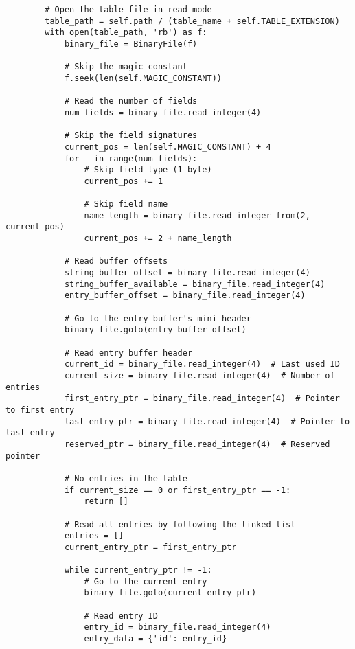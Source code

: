 \documentclass[utf8]{article}
\begin{document}
\begin{verbatim}
        # Open the table file in read mode
        table_path = self.path / (table_name + self.TABLE_EXTENSION)
        with open(table_path, 'rb') as f:
            binary_file = BinaryFile(f)
            
            # Skip the magic constant
            f.seek(len(self.MAGIC_CONSTANT))
            
            # Read the number of fields
            num_fields = binary_file.read_integer(4)
            
            # Skip the field signatures
            current_pos = len(self.MAGIC_CONSTANT) + 4
            for _ in range(num_fields):
                # Skip field type (1 byte)
                current_pos += 1
                
                # Skip field name
                name_length = binary_file.read_integer_from(2, current_pos)
                current_pos += 2 + name_length
            
            # Read buffer offsets
            string_buffer_offset = binary_file.read_integer(4)
            string_buffer_available = binary_file.read_integer(4)
            entry_buffer_offset = binary_file.read_integer(4)
            
            # Go to the entry buffer's mini-header
            binary_file.goto(entry_buffer_offset)
            
            # Read entry buffer header
            current_id = binary_file.read_integer(4)  # Last used ID
            current_size = binary_file.read_integer(4)  # Number of entries
            first_entry_ptr = binary_file.read_integer(4)  # Pointer to first entry
            last_entry_ptr = binary_file.read_integer(4)  # Pointer to last entry
            reserved_ptr = binary_file.read_integer(4)  # Reserved pointer
            
            # No entries in the table
            if current_size == 0 or first_entry_ptr == -1:
                return []
            
            # Read all entries by following the linked list
            entries = []
            current_entry_ptr = first_entry_ptr
            
            while current_entry_ptr != -1:
                # Go to the current entry
                binary_file.goto(current_entry_ptr)
                
                # Read entry ID
                entry_id = binary_file.read_integer(4)
                entry_data = {'id': entry_id}
                

\end{verbatim}
\end{document}
